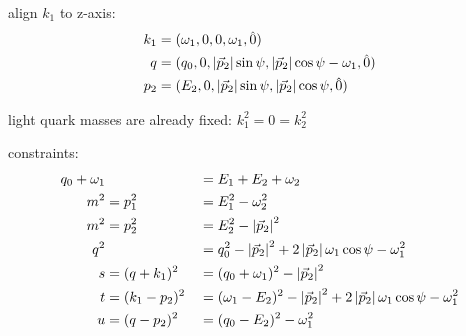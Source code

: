 align $k_1$ to z-axis:
\begin{align}
k_1 &= (\omega_1,0,0,\omega_1, \hat 0)\\
q &= (q_0,0,\left|\vec p_2\right|\sin\psi,\left|\vec p_2\right|\cos\psi-\omega_1, \hat 0)\\
p_2 &= (E_2,0,\left|\vec p_2\right|\sin\psi,\left|\vec p_2\right|\cos\psi, \hat 0)
\end{align}

light quark masses are already fixed: $k_1^2 = 0 = k_2^2$

constraints:
\begin{align}
q_0+\omega_1 & &&=E_1+E_2+\omega_2 \label{eq:PSConIMomCon}\\
m^2 &= p_1^2 &&= E_1^2 - \omega_2^2 \label{eq:PSConIp1}\\
m^2 &= p_2^2 &&= E_2^2 - \left|\vec p_2\right|^2 \label{eq:PSConIp2} \\
q^2 & &&= q_0^2 - \left|\vec p_2\right|^2 + 2\left|\vec p_2\right|\omega_1\cos\psi-\omega_1^2 \label{eq:PSConIq}\\
s &= (q+k_1)^2 &&= (q_0+\omega_1)^2 - \left|\vec p_2\right|^2 \label{eq:PSConIs}\\
t &= (k_1-p_2)^2 &&= (\omega_1-E_2)^2-\left|\vec p_2\right|^2+2\left|\vec p_2\right|\omega_1\cos\psi-\omega_1^2 \label{eq:PSConIt}\\
u &= (q-p_2)^2 &&= (q_0-E_2)^2 - \omega_1^2 \label{eq:PSConIu}
\end{align}

